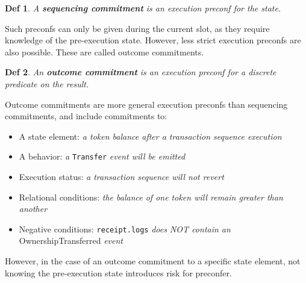 \documentclass[a4paper]{article}
\theoremstyle{boldstyle}
\newtheorem*{definitionx}{Def}
\newenvironment{definition}
  {\begin{defopenboxq}\begin{definitionx}}
  {\end{definitionx}\end{defopenboxq}}
\newcommand{\cm}[1]{\textcolor{blue}{\textbf{Conor:} #1}}
\newcommand{\qb}[1]{\textcolor{red}{\textbf{Quentin:} #1}}
\begin{document}
        \begin{definition}
            A \textbf{sequencing commitment} is an execution preconf for the state.
        \end{definition}
        Such preconfs can only be given during the current slot, as they require knowledge of the pre-execution state. However, less strict execution preconfs are also possible. These are called outcome commitments.
        \begin{definition}
            An \textbf{outcome commitment} is an execution preconf for a discrete predicate on the result.
        \end{definition}
        Outcome commitments are more general execution preconfs than sequencing commitments, and include commitments to:
            \begin{itemize}
                \item A state element: \textit{a token balance after a transaction sequence execution }
                \item A behavior: \textit{a} \texttt{Transfer} \textit{event will be emitted} 
                \item Execution status: \textit{a transaction sequence will not revert}
                \item Relational conditions: \textit{the balance of one token will remain greater than another}
                \item Negative conditions: \texttt{receipt.logs} \textit{does NOT contain an} {OwnershipTransferred} \textit{event}
            \end{itemize}
        However, in the case of an outcome commitment to a specific state element, not knowing the pre-execution state introduces risk for preconfer.

         

        


        
\end{document}
